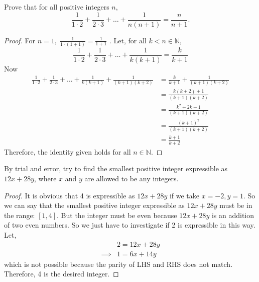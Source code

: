 \documentclass[12pt]{article}
\newenvironment{problem}[2][Problem]{\begin{trivlist}
\item[\hskip \labelsep {\bfseries #1}\hskip \labelsep {\bfseries #2.}]}{\end{trivlist}}
\begin{document}
\begin{problem}{8}
Prove that for all positive integers \( n \),
\[
\frac{1}{1 \cdot 2} + \frac{1}{2 \cdot 3} + \dots + \frac{1}{n(n + 1)} = \frac{n}{n + 1}.
\]

\end{problem}

\begin{proof}
For $n = 1, \; \frac{1}{1 \cdot (1+1)} = \frac{1}{1 + 1}$ .
Let, $\text{for all } k < n \in \mathbb{N}$,
\[
\frac{1}{1 \cdot 2} + \frac{1}{2 \cdot 3} + \dots + \frac{1}{k(k + 1)} = \frac{k}{k + 1}
\]
Now
\begin{align*}
\frac{1}{1 \cdot 2} + \frac{1}{2 \cdot 3} + \dots + \frac{1}{k(k + 1)} + \frac{1}{(k+1)(k+2)}
& = \frac{k}{k + 1} + \frac{1}{(k+1)(k+2)} \\
& = \frac{k(k+2) + 1}{(k+1)(k+2)} \\
& = \frac{k^2 + 2k + 1}{(k+1)(k+2)} \\
& = \frac{(k+1)^2}{(k+1)(k+2)} \\
& = \frac{k + 1}{k + 2}
\end{align*}
Therefore, the identity given holds for all $n \in \mathbb{N}$.

\end{proof}

\begin{problem}{9}
By trial and error, try to find the smallest positive integer expressible as \( 12x + 28y \),
where \( x \) and \( y \) are allowed to be any integers.

\end{problem}

\begin{proof}
It is obvious that 4 is expressible as $12x + 28y$ if we take $x = -2, y = 1$. So we can say that the smallest positive integer expressible as $12x + 28y$ must be in the range: $[1, 4]$. But the integer must be even because $12x + 28y$ is an addition of two even numbers. So we just have to investigate if 2 is expressible in this way.\\
Let,
\begin{align*}
& 2 = 12x + 28y \\
\implies & 1 = 6x + 14y
\end{align*}
which is not possible because the parity of LHS and RHS does not match. Therefore, 4 is the desired integer.

\end{proof}
\end{document}
